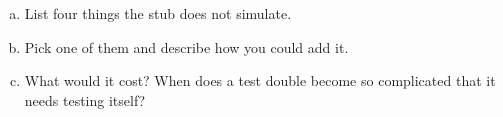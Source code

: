\label{ex:6:4}
\begin{enumerate}[a)]
  \item List four things the stub does not simulate.
  \item Pick one of them and describe how you could add it.
  \item What would it cost? When does a test double become so complicated that it needs testing
    itself?
\end{enumerate}
